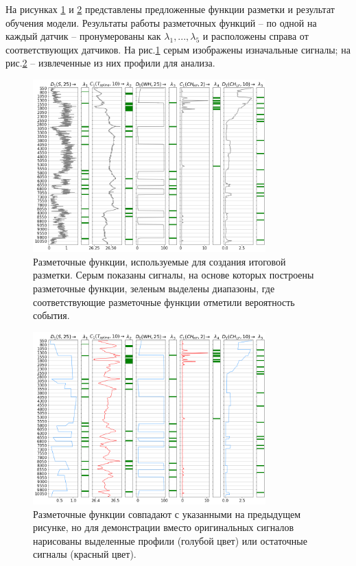 На рисунках \ref{fig:lfs_signals} и \ref{fig:lfs_dpls} представлены предложенные функции разметки и результат обучения модели. Результаты работы разметочных функций – по одной на каждый датчик – пронумерованы как $\lambda_1, ..., \lambda_5$ и расположены справа от соответствующих датчиков. На рис.\ref{fig:lfs_signals} серым изображены изначальные сигналы; на рис.\ref{fig:lfs_dpls} – извлеченные из них профили для анализа.

\begin{figure}[H]
\centering
\includegraphics[width=0.8\textwidth]{WS/lfs_signals.png}
\caption{Разметочные функции, используемые для создания итоговой разметки. Серым показаны сигналы, на основе которых построены разметочные функции, зеленым выделены диапазоны, где соответствующие разметочные функции отметили вероятность события.}
\label{fig:lfs_signals}
\end{figure}

\begin{figure}[H]
\centering
\includegraphics[width=0.8\textwidth]{WS/lfs_dpls.png}
\caption{Разметочные функции совпадают с указанными на предыдущем рисунке, но для демонстрации вместо оригинальных сигналов нарисованы выделенные профили (голубой цвет) или остаточные сигналы (красный цвет).}
\label{fig:lfs_dpls}
\end{figure}

